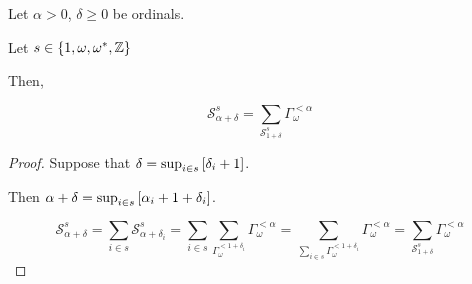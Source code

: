 \begin{corollary}
  Let $\alpha > 0$, $\delta \ge 0$ be ordinals.

  Let $s \in \left\{ {1, \omega, \omega^\ast, \mathbb{Z}} \right\}$

  Then,
  
  \[
    \mathcal{S}^{s}_{\alpha + \delta}
    = \sum_{\mathcal{S}^{s}_{1 + \delta}}{\Gamma_{\omega}^{< \alpha}}
  \]
\end{corollary}

\begin{proof}
  Suppose that $\delta = \sup_{i \in s} \left[ {\delta_i + 1} \right]$.

  Then $\alpha + \delta = \sup_{i \in s} \left[ {\alpha_i + 1 + \delta_i} \right]$.

  \[
    \mathcal{S}^{s}_{\alpha + \delta}
    = \sum_{i \in s}{\mathcal{S}^{s}_{\alpha + \delta_i}}
    = \sum_{i \in s}\sum_{\Gamma_{\omega}^{< 1 + \delta_i}}{\Gamma_{\omega}^{< \alpha}}
    = \sum_{\sum_{i \in s}{\Gamma_{\omega}^{< 1 + \delta_i}}}{\Gamma_{\omega}^{< \alpha}}
    = \sum_{\mathcal{S}^{s}_{1 + \delta}}{\Gamma_{\omega}^{< \alpha}}
  \]
\end{proof}